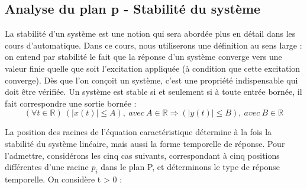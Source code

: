 	\subsection{Analyse du plan p - Stabilité du système}
	La stabilité d'un système est une notion qui sera abordée plus en détail dans les cours d'automatique. Dans ce cours, nous utiliserons une définition au sens large : on entend par stabilité le fait que la réponse d'un système converge vers une valeur finie quelle que soit l'excitation appliquée (à condition que cette excitation converge). Dès que l'on conçoit un système, c'est une propriété indispensable qui doit être vérifiée.
	Un système est stable si et seulement si à toute entrée bornée, il fait correspondre une sortie bornée :
	\begin{equation}
	(\forall t \in \mathbb{R})~(|x(t)| \leq A),~avec~A \in \mathbb{R} \Rightarrow (|y(t)| \leq B),~avec~B \in \mathbb{R}
	\end{equation}
	
	
	La position des racines de l'équation caractéristique détermine à la fois la stabilité du système linéaire, mais aussi la forme temporelle de réponse. Pour l'admettre, considérons les cinq cas suivants, correspondant à cinq positions différentes d'une racine $p_{i}$ dans le plan P, et déterminons le type de réponse temporelle. On considère t > 0 :
	
